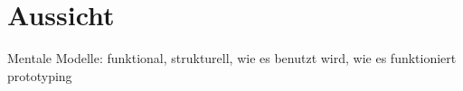 
\section{Aussicht}
Mentale Modelle: funktional, strukturell, wie es benutzt wird, wie es funktioniert\\

prototyping 